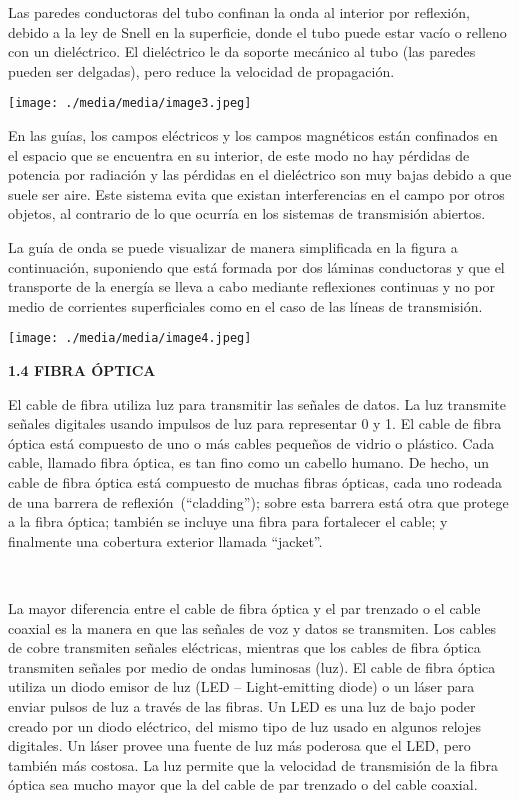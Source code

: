 Las paredes conductoras del tubo confinan la onda al interior por
reflexión, debido a la ley de Snell en la superficie, donde el tubo
puede estar vacío o relleno con un dieléctrico. El dieléctrico le da
soporte mecánico al tubo (las paredes pueden ser delgadas), pero reduce
la velocidad de propagación.

\texttt{[image: ./media/media/image3.jpeg]}

En las guías, los campos eléctricos y los campos magnéticos están
confinados en el espacio que se encuentra en su interior, de este modo
no hay pérdidas de potencia por radiación y las pérdidas en el
dieléctrico son muy bajas debido a que suele ser aire. Este sistema
evita que existan interferencias en el campo por otros objetos, al
contrario de lo que ocurría en los sistemas de transmisión abiertos.

La guía de onda se puede visualizar de manera simplificada en la figura
a continuación, suponiendo que está formada por dos láminas conductoras
y que el transporte de la energía se lleva a cabo mediante reflexiones
continuas y no por medio de corrientes superficiales como en el caso de
las líneas de transmisión.

\texttt{[image: ./media/media/image4.jpeg]}

\textbf{1.4 FIBRA ÓPTICA}

El cable de fibra utiliza luz para transmitir las señales de datos. La
luz transmite señales digitales usando impulsos de luz para representar
0 y 1. El cable de fibra óptica está compuesto de uno o más cables
pequeños de vidrio o plástico. Cada cable, llamado fibra óptica, es tan
fino como un cabello humano. De hecho, un cable de fibra óptica está
compuesto de muchas fibras ópticas, cada uno rodeada de una barrera de
reflexión~(``cladding''); sobre esta barrera está otra que protege a la
fibra óptica; también se incluye una fibra para fortalecer el cable; y
finalmente una cobertura exterior llamada ``jacket''.

~

La mayor diferencia entre el cable de fibra óptica y el par trenzado o
el cable coaxial es la manera en que las señales de voz y datos se
transmiten. Los cables de cobre transmiten señales eléctricas, mientras
que los cables de fibra óptica transmiten señales por medio de ondas
luminosas (luz). El cable de fibra óptica utiliza un diodo emisor de luz
(LED -- Light-emitting diode) o un láser para enviar pulsos de luz a
través de las fibras. Un LED es una luz de bajo poder creado por un
diodo eléctrico, del mismo tipo de luz usado en algunos relojes
digitales. Un láser provee una fuente de luz más poderosa que el LED,
pero también más costosa. La luz permite que la velocidad de transmisión
de la fibra óptica sea mucho mayor que la del cable de par trenzado o
del cable coaxial.

